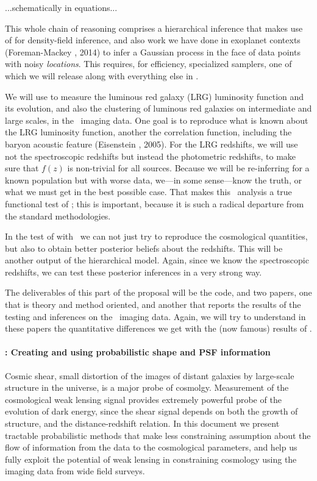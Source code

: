 \documentclass[12pt]{article}
\begin{document}
...schematically in equations...

This whole chain of reasoning comprises a hierarchical inference that
makes use of  for density-field inference, and
also work we have done in exoplanet contexts (Foreman-Mackey \etal, 2014) to infer a
Gaussian process in the face of data points with noisy \emph{locations}.
This requires, for efficiency, specialized samplers, one
of which we will release along with everything else in
.

We will use  to measure the luminous red galaxy
(LRG) luminosity function and its evolution, and also the clustering
of luminous red galaxies on intermediate and large scales, in the
\sdss\ imaging data.
One goal is to reproduce what is known about the LRG luminosity
function, another the correlation function, including the baryon
acoustic feature (Eisenstein \etal, 2005).
For the LRG redshifts, we will use not the spectroscopic redshifts but
instead the photometric redshifts, to make sure that $f(z)$ is
non-trivial for all sources.
Because we will be re-inferring for a known population but with worse
data, we---in some sense---know the truth, or what we must get in the
best possible case.
That makes this \sdss\ analysis a true functional test of
; this is important, because it is such a radical
departure from the standard methodologies.

In the test of  with \sdss\ we can not just try to
reproduce the cosmological quantities, but also to obtain better
posterior beliefs about the redshifts.
This will be another output of the hierarchical model.
Again, since we know the spectroscopic redshifts, we can test these
posterior inferences in a very strong way.

The deliverables of this part of the proposal will be the
 code, and two papers, one that is theory and
method oriented, and another that reports the results of the testing
and inferences on the \sdss\ imaging data.
Again, we will try to understand in these papers the quantitative
differences we get with the (now famous) results of \sdss.

\paragraph{: Creating and using probabilistic shape and PSF information}

Cosmic shear, small distortion of the images of distant
galaxies by large-scale structure in the universe,
is a major probe of cosmolgy. Measurement of the cosmological
weak lensing signal provides extremely powerful probe of the
evolution of dark energy, since the shear signal depends on
both the growth of structure, and the distance-redshift relation.
In this document we present tractable probabilistic methods that
make less constraining assumption about the flow of information
from the data to the cosmological parameters, and help us fully exploit
the potential of weak lensing in  constraining cosmology using the
imaging data from wide field surveys.
\end{document}
